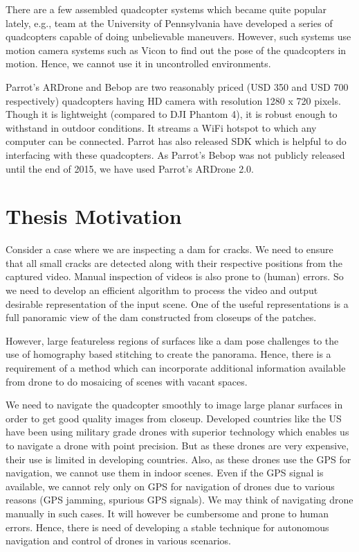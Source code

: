 There are a few assembled quadcopter systems which became quite popular lately,
e.g., team at the University of Pennsylvania have developed a series of
quadcopters capable of doing unbelievable maneuvers. However, such systems use motion camera
systems such as Vicon to find out the pose of the quadcopters in motion.
Hence, we cannot use it in uncontrolled environments.

Parrot's ARDrone and Bebop are two reasonably priced (USD 350 and USD
700 respectively) quadcopters having HD camera with resolution 1280 x 720
pixels. Though it is lightweight (compared to DJI Phantom 4), it is robust
enough to withstand in outdoor conditions. It streams a WiFi hotspot to which
any computer can be connected. Parrot has also released SDK which is helpful to
do interfacing with these quadcopters. As Parrot's Bebop was not publicly
released until the end of 2015, we have used Parrot's ARDrone 2.0.

\section{Thesis Motivation}

Consider a case where  we are inspecting a dam for cracks. We need to ensure
that all small cracks are detected along with their respective positions from
the captured video. Manual inspection of videos is also prone to (human) errors. 
So we need to develop an efficient algorithm to process the video and output desirable representation of the input
scene. One of the useful representations is a full panoramic view of the dam
constructed from closeups of the patches. 

However, large featureless regions of surfaces like a dam pose challenges to
the use of homography based stitching to create the panorama. Hence, there is a
requirement of a method which can incorporate additional information available from drone to do
mosaicing of scenes with vacant spaces. 

We need to navigate the quadcopter smoothly to image large planar surfaces in
order to get good quality images from closeup. Developed countries like the US
have been using military grade drones with superior technology which enables us to
navigate a drone with point precision. But as these drones are very expensive,
their use is limited in developing countries. Also, as these drones use the GPS
for navigation, we cannot use them in indoor scenes. Even if the GPS signal is
available, we cannot rely only on GPS for navigation of drones due to various
reasons (GPS jamming, spurious GPS signals). We may think of navigating drone
manually in such cases. It will however be cumbersome and prone to human errors.
Hence, there is need of developing a stable technique for autonomous navigation
and control of drones in various scenarios.

